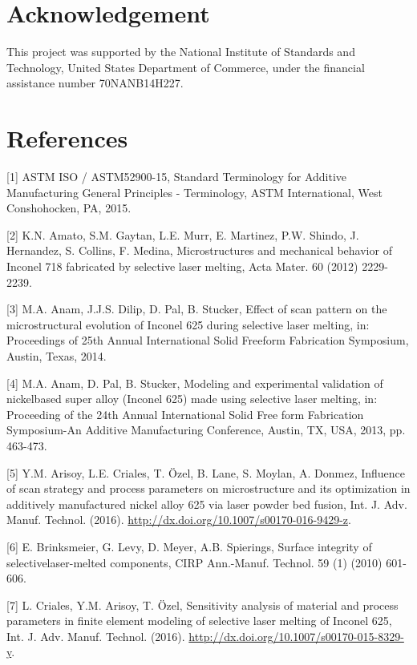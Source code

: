 \documentclass[10pt]{article}
\begin{document}
\section*{Acknowledgement}
This project was supported by the National Institute of Standards and Technology, United States Department of Commerce, under the financial assistance number 70NANB14H227.

\section*{References}
[1] ASTM ISO / ASTM52900-15, Standard Terminology for Additive Manufacturing General Principles - Terminology, ASTM International, West Conshohocken, PA, 2015.

[2] K.N. Amato, S.M. Gaytan, L.E. Murr, E. Martinez, P.W. Shindo, J. Hernandez, S. Collins, F. Medina, Microstructures and mechanical behavior of Inconel 718 fabricated by selective laser melting, Acta Mater. 60 (2012) 2229-2239.

[3] M.A. Anam, J.J.S. Dilip, D. Pal, B. Stucker, Effect of scan pattern on the microstructural evolution of Inconel 625 during selective laser melting, in: Proceedings of 25th Annual International Solid Freeform Fabrication Symposium, Austin, Texas, 2014.

[4] M.A. Anam, D. Pal, B. Stucker, Modeling and experimental validation of nickelbased super alloy (Inconel 625) made using selective laser melting, in: Proceeding of the 24th Annual International Solid Free form Fabrication Symposium-An Additive Manufacturing Conference, Austin, TX, USA, 2013, pp. 463-473.

[5] Y.M. Arisoy, L.E. Criales, T. Özel, B. Lane, S. Moylan, A. Donmez, Influence of scan strategy and process parameters on microstructure and its optimization in additively manufactured nickel alloy 625 via laser powder bed fusion, Int. J. Adv. Manuf. Technol. (2016). \href{http://dx.doi.org/10.1007/s00170-016-9429-z}{http://dx.doi.org/10.1007/s00170-016-9429-z}.

[6] E. Brinksmeier, G. Levy, D. Meyer, A.B. Spierings, Surface integrity of selectivelaser-melted components, CIRP Ann.-Manuf. Technol. 59 (1) (2010) 601-606.

[7] L. Criales, Y.M. Arisoy, T. Özel, Sensitivity analysis of material and process parameters in finite element modeling of selective laser melting of Inconel 625, Int. J. Adv. Manuf. Technol. (2016). \href{http://dx.doi.org/10.1007/s00170-015-8329-y}{http://dx.doi.org/10.1007/s00170-015-8329-y}.
\end{document}

